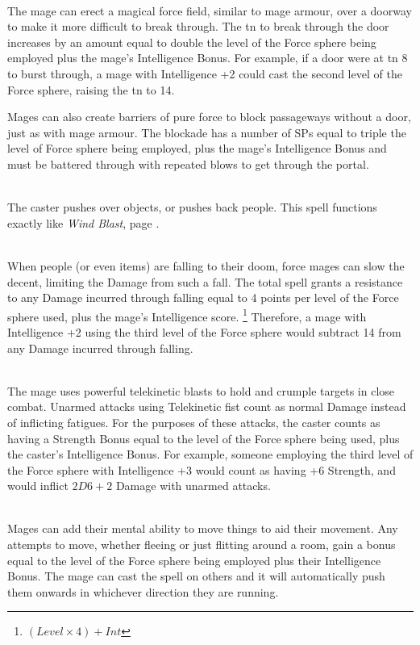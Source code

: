 \begin{multicols}{2}
\\
The mage can erect a magical force field, similar to mage armour, over a doorway to make it more difficult to break through.
The \gls{tn} to break through the door increases by an amount equal to double the level of the Force sphere being employed plus the mage's Intelligence Bonus.
For example, if a door were at \gls{tn} 8 to burst through, a mage with Intelligence +2 could cast the second level of the Force sphere, raising the \gls{tn} to 14.

Mages can also create barriers of pure force to block passageways without a door, just as with mage armour.
The blockade has a number of \glspl{SP} equal to triple the level of Force sphere being employed, plus the mage's Intelligence Bonus and must be battered through with repeated blows to get through the portal.

\\
The caster pushes over objects, or pushes back people.
This spell functions exactly like \textit{Wind Blast}, page \pageref{windblast}.

\\
When people (or even items) are falling to their doom, force mages can slow the decent, limiting the Damage from such a fall.
The total spell grants a resistance to any Damage incurred through falling equal to 4 points per level of the Force sphere used, plus the mage's Intelligence score.%
\footnote{$(Level \times 4) + Int$}
Therefore, a mage with Intelligence +2 using the third level of the Force sphere would subtract 14 from any Damage incurred through falling.

\\
The mage uses powerful telekinetic blasts to hold and crumple targets in close combat.
Unarmed attacks using Telekinetic fist count as normal Damage instead of inflicting \glspl{fatigue}.
For the purposes of these attacks, the caster counts as having a Strength Bonus equal to the level of the Force sphere being used, plus the caster's Intelligence Bonus.
For example, someone employing the third level of the Force sphere with Intelligence +3 would count as having +6 Strength, and would inflict $2D6+2$ Damage with unarmed attacks.

\\
Mages can add their mental ability to move things to aid their movement.
Any attempts to move, whether fleeing or just flitting around a room, gain a bonus equal to the level of the Force sphere being employed plus their Intelligence Bonus.
The mage can cast the spell on others and it will automatically push them onwards in whichever direction they are running.


\end{multicols}
